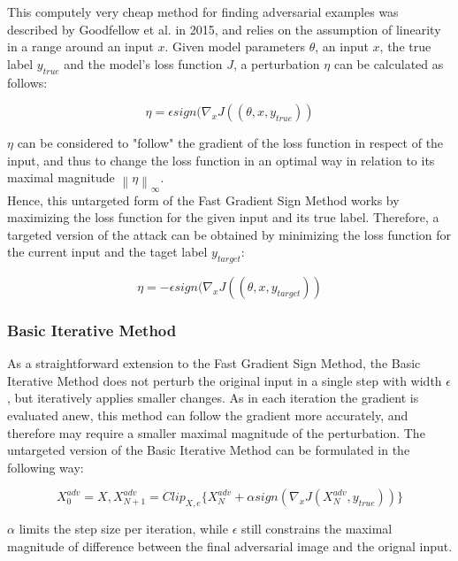\documentclass[draft,final]{vutinfth} %
\newcommand{\norm}[1]{\left\lVert#1\right\rVert}
\begin{document}
This computely very cheap method for finding adversarial examples was described by Goodfellow et al. in 2015, and relies on the assumption of linearity in a range around an input $x$.
Given model parameters $\theta$, an input $x$, the true label $y_{true}$ and the model's loss function $J$, a perturbation $\eta$ can be calculated as follows:

\begin{equation}
	\eta = \epsilon sign(\nabla_xJ((\theta, x, y_{true}))
\end{equation}

$\eta$ can be considered to "follow" the gradient of the loss function in respect of the input, and thus to change the loss function in an optimal way in relation to its maximal magnitude $\norm{\eta}_\infty$.
\\
Hence, this untargeted form of the Fast Gradient Sign Method works by maximizing the loss function for the given input and its true label.
Therefore, a targeted version of the attack can be obtained by minimizing the loss function for the current input and the taget label $y_{target}$:

\begin{equation}
	\eta = -\epsilon sign(\nabla_xJ((\theta, x, y_{target}))
\end{equation}
\cite{Goodfellow2015}

\subsubsection{Basic Iterative Method}

As a straightforward extension to the Fast Gradient Sign Method, the Basic Iterative Method does not perturb the original input in a single step with width $\epsilon$, but iteratively applies smaller changes. As in each iteration the gradient is evaluated anew, this method can follow the gradient more accurately, and therefore may require a smaller maximal magnitude of the perturbation. The untargeted version of the Basic Iterative Method can be formulated in the following way:

\begin{equation}
	X^{adv}_0 = X, X^{adv}_{N+1} = Clip_{X,e}\{X^{adv}_{N} + \alpha sign(\nabla_xJ(X^{adv}_{N}, y_{true})) \}
\end{equation}

$\alpha$ limits the step size per iteration, while $\epsilon$ still constrains the maximal magnitude of difference between the final adversarial image and the orignal input.
\end{document}
